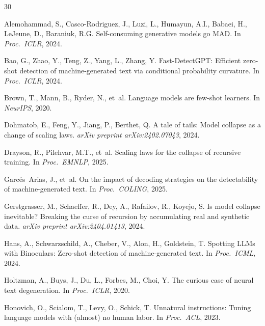 \documentclass[11pt,a4paper]{article}
\begin{document}
\begin{thebibliography}{30}

Alemohammad, S., Casco-Rodriguez, J., Luzi, L., Humayun, A.I., Babaei, H., LeJeune, D., Baraniuk, R.G.
\newblock Self-consuming generative models go MAD.
\newblock In \emph{Proc.\ ICLR}, 2024.

Bao, G., Zhao, Y., Teng, Z., Yang, L., Zhang, Y.
\newblock Fast-{D}etect{GPT}: Efficient zero-shot detection of machine-generated text via conditional probability curvature.
\newblock In \emph{Proc.\ ICLR}, 2024.

Brown, T., Mann, B., Ryder, N., et~al.
\newblock Language models are few-shot learners.
\newblock In \emph{NeurIPS}, 2020.

Dohmatob, E., Feng, Y., Jiang, P., Berthet, Q.
\newblock A tale of tails: Model collapse as a change of scaling laws.
\newblock \emph{arXiv preprint arXiv:2402.07043}, 2024.

Drayson, R., Pilehvar, M.T., et~al.
\newblock Scaling laws for the collapse of recursive training.
\newblock In \emph{Proc.\ EMNLP}, 2025.

Garc\'es~Arias, J., et~al.
\newblock On the impact of decoding strategies on the detectability of machine-generated text.
\newblock In \emph{Proc.\ COLING}, 2025.

Gerstgrasser, M., Schaeffer, R., Dey, A., Rafailov, R., Koyejo, S.
\newblock Is model collapse inevitable? Breaking the curse of recursion by accumulating real and synthetic data.
\newblock \emph{arXiv preprint arXiv:2404.01413}, 2024.

Hans, A., Schwarzschild, A., Cheber, V., Alon, H., Goldstein, T.
\newblock Spotting {LLM}s with {B}inoculars: Zero-shot detection of machine-generated text.
\newblock In \emph{Proc.\ ICML}, 2024.

Holtzman, A., Buys, J., Du, L., Forbes, M., Choi, Y.
\newblock The curious case of neural text degeneration.
\newblock In \emph{Proc.\ ICLR}, 2020.

Honovich, O., Scialom, T., Levy, O., Schick, T.
\newblock Unnatural instructions: Tuning language models with (almost) no human labor.
\newblock In \emph{Proc.\ ACL}, 2023.


\end{thebibliography}
\end{document}
